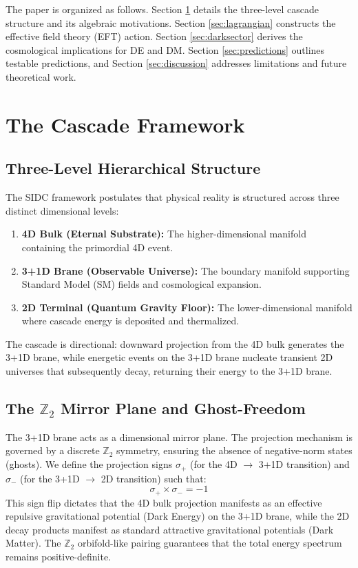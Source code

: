 \documentclass[12pt, a4paper]{article}
\begin{document}
The paper is organized as follows. Section \ref{sec:framework} details the three-level cascade structure and its algebraic motivations. Section \ref{sec:lagrangian} constructs the effective field theory (EFT) action. Section \ref{sec:darksector} derives the cosmological implications for DE and DM. Section \ref{sec:predictions} outlines testable predictions, and Section \ref{sec:discussion} addresses limitations and future theoretical work.

\section{The Cascade Framework}
\label{sec:framework}

\subsection{Three-Level Hierarchical Structure}
The SIDC framework postulates that physical reality is structured across three distinct dimensional levels:
\begin{enumerate}
    \item \textbf{4D Bulk (Eternal Substrate):} The higher-dimensional manifold containing the primordial 4D event.
    \item \textbf{3+1D Brane (Observable Universe):} The boundary manifold supporting Standard Model (SM) fields and cosmological expansion.
    \item \textbf{2D Terminal (Quantum Gravity Floor):} The lower-dimensional manifold where cascade energy is deposited and thermalized.
\end{enumerate}
The cascade is directional: downward projection from the 4D bulk generates the 3+1D brane, while energetic events on the 3+1D brane nucleate transient 2D universes that subsequently decay, returning their energy to the 3+1D brane.

\subsection{The $\mathbb{Z}_{2}$ Mirror Plane and Ghost-Freedom}
The 3+1D brane acts as a dimensional mirror plane. The projection mechanism is governed by a discrete $\mathbb{Z}_{2}$ symmetry, ensuring the absence of negative-norm states (ghosts). We define the projection signs $\sigma_+$ (for the 4D $\to$ 3+1D transition) and $\sigma_-$ (for the 3+1D $\to$ 2D transition) such that:
\begin{equation}
    \sigma_+ \times \sigma_- = -1
\end{equation}
This sign flip dictates that the 4D bulk projection manifests as an effective repulsive gravitational potential (Dark Energy) on the 3+1D brane, while the 2D decay products manifest as standard attractive gravitational potentials (Dark Matter). The $\mathbb{Z}_{2}$ orbifold-like pairing guarantees that the total energy spectrum remains positive-definite.
\end{document}
